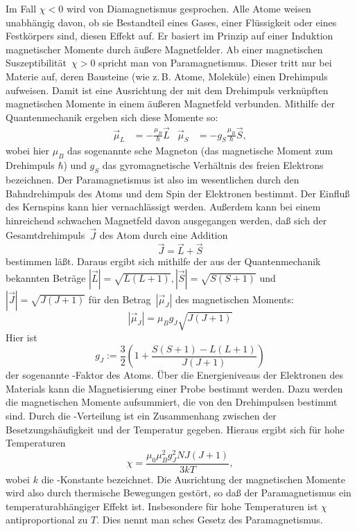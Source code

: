 Im Fall $\chi < 0$ wird von Diamagnetismus gesprochen.  Alle Atome
weisen unabhängig davon, ob sie Bestandteil eines Gases, einer
Flüssigkeit oder eines Festkörpers sind, diesen Effekt auf.  Er basiert
im Prinzip auf einer Induktion magnetischer Momente durch äußere
Magnetfelder.  Ab einer magnetischen Suszeptibilität~$\chi>0$ spricht
man von Paramagnetismus.  Dieser tritt nur bei Materie auf, deren
Bausteine (wie z.\,B. Atome, Moleküle) einen Drehimpuls aufweisen.
Damit ist eine Ausrichtung der mit dem Drehimpuls verknüpften
magnetischen Momente in einem äußeren Magnetfeld verbunden.  Mithilfe
der Quantenmechanik ergeben sich diese Momente so:
\begin{align}
  \vec\mu_L &= -\frac{\mu_B}{\hbar} \vec{L} &
  \vec\mu_S &= -g_S\frac{\mu_B}{\hbar} \vec{S},
\end{align}
wobei hier $\mu_B$ das sogenannte sche Magneton (das
magnetische Moment zum Drehimpuls $\hbar$) und $g_S$ das gyromagnetische
Verhältnis des freien Elektrons bezeichnen.  Der Paramagnetismus ist
also im wesentlichen durch den Bahndrehimpuls des Atoms und dem Spin der
Elektronen bestimmt.  Der Einfluß des Kernspins kann hier vernachlässigt
werden.  Außerdem kann bei einem hinreichend schwachen Magnetfeld davon
ausgegangen werden, daß sich der Gesamtdrehimpuls~$\vec{J}$ des Atom
durch eine Addition
\begin{equation}
  \vec{J} = \vec{L} + \vec{S}
\end{equation}
bestimmen läßt.  Daraus ergibt sich mithilfe der aus der Quantenmechanik
bekannten Beträge $|\vec{L}| = \sqrt{L(L + 1)}, |\vec{S}| = \sqrt{S(S +
  1)}$ und $|\vec{J}| = \sqrt{J(J+1)}$ für den Betrag~$|\vec{\mu}_J|$
des magnetischen Moments:
\begin{equation}
  |\vec{\mu}_J| = \mu_B g_J \sqrt{J(J + 1)}
\end{equation}
Hier ist
\begin{equation}
g_J := \frac{3}{2} \left(1 + \frac{S(S + 1) - L(L+1)}{J(J + 1)}\right)
\end{equation}
der sogenannte -Faktor des Atoms.  Über die Energieniveaus
der Elektronen des Materials kann die Magnetisierung einer Probe
bestimmt werden.  Dazu werden die magnetischen Momente aufsummiert, die
von den Drehimpulsen bestimmt sind.  Durch die
-Verteilung ist ein Zusammenhang zwischen der
Besetzungshäufigkeit und der Temperatur gegeben.  Hieraus ergibt sich
für hohe Temperaturen
\begin{equation}
  \label{eq:curie-gesetz}
  \chi = \frac{\mu_0 \mu_B^2 g_J^2 N J(J + 1)}{3 k T},
\end{equation}
wobei $k$ die -Konstante bezeichnet.  Die Ausrichtung
der magnetischen Momente wird also durch thermische Bewegungen gestört,
so daß der Paramagnetismus ein temperaturabhängiger Effekt ist.
Insbesondere für hohe Temperaturen ist $\chi$ antiproportional zu $T$.
Dies nennt man sches Gesetz des Paramagnetismus.

